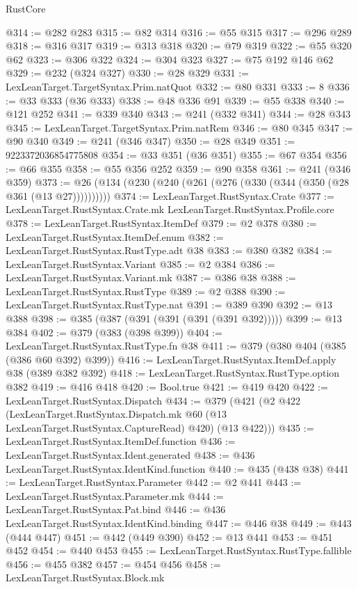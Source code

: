 \begin{lexlean}{RustCore}
\begin{coremodule}
@314 := @282 @283
@315 := @82 @314
@316 := @55 @315
@317 := @296 @289
@318 := @316 @317
@319 := @313 @318
@320 := @79 @319
@322 := @55 @320 @62
@323 := @306 @322
@324 := @304 @323
@327 := @75 @192 @146 @62
@329 := @232 (@324 @327)
@330 := @28 @329
@331 := LexLeanTarget.TargetSyntax.Prim.natQuot
@332 := @80 @331
@333 := 8
@336 := @33 @333 (@36 @333)
@338 := @48 @336 @91
@339 := @55 @338
@340 := @121 @252
@341 := @339 @340
@343 := @241 (@332 @341)
@344 := @28 @343
@345 := LexLeanTarget.TargetSyntax.Prim.natRem
@346 := @80 @345
@347 := @90 @340
@349 := @241 (@346 @347)
@350 := @28 @349
@351 := 9223372036854775808
@354 := @33 @351 (@36 @351)
@355 := @67 @354
@356 := @66 @355
@358 := @55 @356 @252
@359 := @90 @358
@361 := @241 (@346 @359)
@373 := @26 (@134 (@230 (@240 (@261 (@276 (@330 (@344 (@350 (@28 @361 (@13 @27))))))))))
@374 := LexLeanTarget.RustSyntax.Crate
@377 := LexLeanTarget.RustSyntax.Crate.mk LexLeanTarget.RustSyntax.Profile.core
@378 := LexLeanTarget.RustSyntax.ItemDef
@379 := @2 @378
@380 := LexLeanTarget.RustSyntax.ItemDef.enum
@382 := LexLeanTarget.RustSyntax.RustType.adt @38
@383 := @380 @382
@384 := LexLeanTarget.RustSyntax.Variant
@385 := @2 @384
@386 := LexLeanTarget.RustSyntax.Variant.mk
@387 := @386 @38
@388 := LexLeanTarget.RustSyntax.RustType
@389 := @2 @388
@390 := LexLeanTarget.RustSyntax.RustType.nat
@391 := @389 @390
@392 := @13 @388
@398 := @385 (@387 (@391 (@391 (@391 (@391 @392)))))
@399 := @13 @384
@402 := @379 (@383 (@398 @399))
@404 := LexLeanTarget.RustSyntax.RustType.fn @38
@411 := @379 (@380 @404 (@385 (@386 @60 @392) @399))
@416 := LexLeanTarget.RustSyntax.ItemDef.apply @38 (@389 @382 @392)
@418 := LexLeanTarget.RustSyntax.RustType.option @382
@419 := @416 @418
@420 := Bool.true
@421 := @419 @420
@422 := LexLeanTarget.RustSyntax.Dispatch
@434 := @379
    (@421
      (@2
        @422
        (LexLeanTarget.RustSyntax.Dispatch.mk @60 (@13 LexLeanTarget.RustSyntax.CaptureRead) @420)
        (@13 @422)))
@435 := LexLeanTarget.RustSyntax.ItemDef.function
@436 := LexLeanTarget.RustSyntax.Ident.generated
@438 := @436 LexLeanTarget.RustSyntax.IdentKind.function
@440 := @435 (@438 @38)
@441 := LexLeanTarget.RustSyntax.Parameter
@442 := @2 @441
@443 := LexLeanTarget.RustSyntax.Parameter.mk
@444 := LexLeanTarget.RustSyntax.Pat.bind
@446 := @436 LexLeanTarget.RustSyntax.IdentKind.binding
@447 := @446 @38
@449 := @443 (@444 @447)
@451 := @442 (@449 @390)
@452 := @13 @441
@453 := @451 @452
@454 := @440 @453
@455 := LexLeanTarget.RustSyntax.RustType.fallible
@456 := @455 @382
@457 := @454 @456
@458 := LexLeanTarget.RustSyntax.Block.mk

\end{coremodule}
\end{lexlean}
